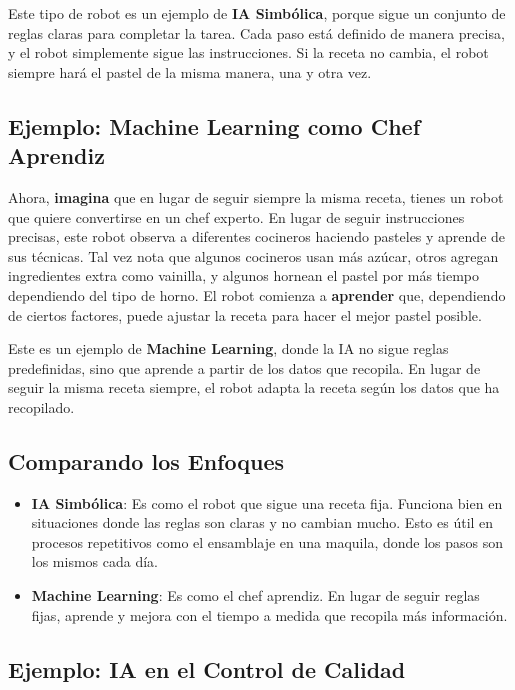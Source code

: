 Este tipo de robot es un ejemplo de \textbf{IA Simbólica}, porque sigue un conjunto de reglas claras para completar la tarea. Cada paso está definido de manera precisa, y el robot simplemente sigue las instrucciones. Si la receta no cambia, el robot siempre hará el pastel de la misma manera, una y otra vez.

\subsection{Ejemplo: Machine Learning como Chef Aprendiz}\label{ejemplo-machine-learning}

Ahora, \textbf{imagina} que en lugar de seguir siempre la misma receta, tienes un robot que quiere convertirse en un chef experto. En lugar de seguir instrucciones precisas, este robot observa a diferentes cocineros haciendo pasteles y aprende de sus técnicas. Tal vez nota que algunos cocineros usan más azúcar, otros agregan ingredientes extra como vainilla, y algunos hornean el pastel por más tiempo dependiendo del tipo de horno. El robot comienza a \textbf{aprender} que, dependiendo de ciertos factores, puede ajustar la receta para hacer el mejor pastel posible.

Este es un ejemplo de \textbf{Machine Learning}, donde la IA no sigue reglas predefinidas, sino que aprende a partir de los datos que recopila. En lugar de seguir la misma receta siempre, el robot adapta la receta según los datos que ha recopilado.

\subsection{Comparando los Enfoques}\label{comparacion-enfoques}

\begin{itemize}
    \item \textbf{IA Simbólica}: Es como el robot que sigue una receta fija. Funciona bien en situaciones donde las reglas son claras y no cambian mucho. Esto es útil en procesos repetitivos como el ensamblaje en una maquila, donde los pasos son los mismos cada día.
    \item \textbf{Machine Learning}: Es como el chef aprendiz. En lugar de seguir reglas fijas, aprende y mejora con el tiempo a medida que recopila más información.
\end{itemize}

\subsection{Ejemplo: IA en el Control de Calidad}\label{ejemplo-control-calidad}

